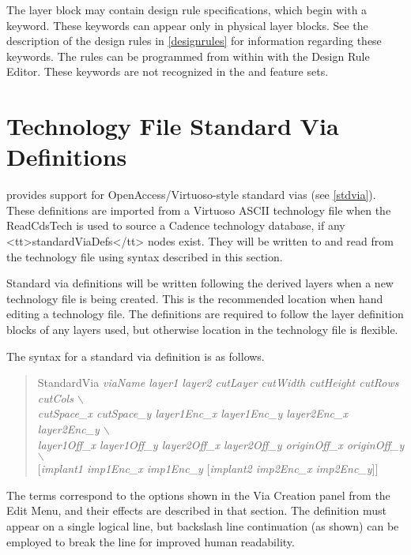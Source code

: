 The layer block may contain design rule specifications, which begin
with a keyword.  These keywords can appear only in physical layer
blocks.  See the description of the design rules in \ref{designrules}
for information regarding these keywords.  The rules can be programmed
from within {\Xic} with the {\cb Design Rule Editor}.  These keywords
are not recognized in the {\XicII} and {\Xiv} feature sets.


\section{Technology File Standard Via Definitions}

{\Xic} provides support for OpenAccess/Virtuoso-style standard vias
(see \ref{stdvia}).  These definitions are imported from a Virtuoso
ASCII technology file when the {\vt ReadCdsTech} is used to source a
Cadence technology database, if any <tt>standardViaDefs</tt> nodes
exist.  They will be written to and read from the {\Xic} technology
file using syntax described in this section.

Standard via definitions will be written following the derived layers
when a new technology file is being created.  This is the recommended
location when hand editing a technology file.  The definitions are
required to follow the layer definition blocks of any layers used, but
otherwise location in the technology file is flexible.

The syntax for a standard via definition is as follows.

\begin{quote}
{\vt StandardVia} {\it viaName layer1 layer2 cutLayer cutWidth
cutHeight cutRows cutCols $\backslash$\\
\hspace*{2em}cutSpace\_x cutSpace\_y layer1Enc\_x layer1Enc\_y layer2Enc\_x
layer2Enc\_y $\backslash$\\
\hspace*{2em}layer1Off\_x layer1Off\_y layer2Off\_x layer2Off\_y
originOff\_x originOff\_y\/} $\backslash$\\
\hspace*{2em}$[${\it implant1 imp1Enc\_x imp1Enc\_y}
$[${\it implant2 imp2Enc\_x imp2Enc\_y\/}$]]$
\end{quote}

The terms correspond to the options shown in the {\cb Via Creation}
panel from the {\cb Edit Menu}, and their effects are described in
that section.  The definition must appear on a single logical line,
but backslash line continuation (as shown) can be employed to break
the line for improved human readability.

